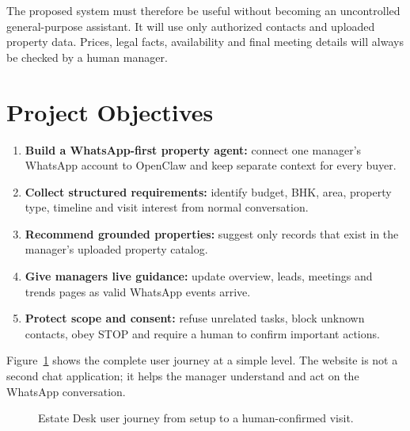 \documentclass{tietreport}
\begin{document}
The proposed system must therefore be useful without becoming an uncontrolled
general-purpose assistant. It will use only authorized contacts and uploaded
property data. Prices, legal facts, availability and final meeting details will
always be checked by a human manager.

\section{Project Objectives}

\begin{enumerate}
  \item \textbf{Build a WhatsApp-first property agent:} connect one manager's
    WhatsApp account to OpenClaw and keep separate context for every buyer.
  \item \textbf{Collect structured requirements:} identify budget, BHK, area,
    property type, timeline and visit interest from normal conversation.
  \item \textbf{Recommend grounded properties:} suggest only records that exist
    in the manager's uploaded property catalog.
  \item \textbf{Give managers live guidance:} update overview, leads, meetings
    and trends pages as valid WhatsApp events arrive.
  \item \textbf{Protect scope and consent:} refuse unrelated tasks, block unknown
    contacts, obey STOP and require a human to confirm important actions.
\end{enumerate}

Figure~\ref{fig:user-journey} shows the complete user journey at a simple level.
The website is not a second chat application; it helps the manager understand
and act on the WhatsApp conversation.

\begin{figure}[H]
\centering
{}
\caption{Estate Desk user journey from setup to a human-confirmed visit.}
\label{fig:user-journey}
\end{figure}
\FloatBarrier
\end{document}
